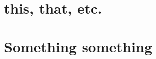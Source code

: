 \documentclass[a4paper,
    11pt,
    headings=small,
    ngerman,
    listof=totoc,
    numbers=noenddot]{scrreprt}[2021/11/13]
\begin{document}
\newpage

\listoffigures
\listoftables
\lstlistoflistings
\printglossaries
\printbibliography

\newpage

\appendix
{}



\chapter{this, that, etc.}




\chapter{Something something}
\end{document}
